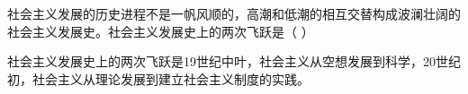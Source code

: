 \question 社会主义发展的历史进程不是一帆风顺的，高潮和低潮的相互交替构成波澜壮阔的社会主义发展史。社会主义发展史上的两次飞跃是（
）
\par{}
\begin{solution}社会主义发展史上的两次飞跃是19世纪中叶，社会主义从空想发展到科学，20世纪初，社会主义从理论发展到建立社会主义制度的实践。
\end{solution}

